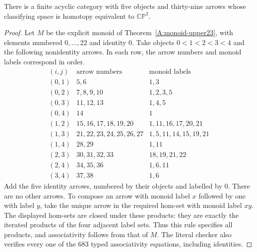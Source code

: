 \begin{theorem}
\label{A7:model39}
There is a finite acyclic category with five objects and thirty-nine
arrows whose classifying space is homotopy equivalent to
$\mathbb{CP}^2$.
\end{theorem}
\begin{proof}
Let $M$ be the explicit monoid of Theorem~\ref{A:monoid-upper23},
with elements numbered $0,\ldots,22$ and identity $0$.
Take objects $0<1<2<3<4$ and the following nonidentity arrows.
In each row, the arrow numbers and monoid labels correspond in order.
\[
\begin{array}{c|c|l}
(i,j)&\text{arrow numbers}&\text{monoid labels}\\\hline
(0,1)&5,6&1,3\\
(0,2)&7,8,9,10&1,2,3,5\\
(0,3)&11,12,13&1,4,5\\
(0,4)&14&1\\
(1,2)&15,16,17,18,19,20&1,11,16,17,20,21\\
(1,3)&21,22,23,24,25,26,27&1,5,11,14,15,19,21\\
(1,4)&28,29&1,11\\
(2,3)&30,31,32,33&18,19,21,22\\
(2,4)&34,35,36&1,6,11\\
(3,4)&37,38&1,6
\end{array}
\]
Add the five identity arrows, numbered by their objects and labelled
by $0$. There are no other arrows. To compose an arrow with monoid
label $x$ followed by one with label $y$, take the unique arrow in
the required hom-set with monoid label $xy$. The displayed hom-sets
are closed under these products: they are exactly the iterated
products of the four adjacent label sets. Thus this rule specifies
all products, and associativity follows from that of $M$.
The literal checker also verifies every one of the $683$ typed
associativity equations, including identities.


\end{proof}
